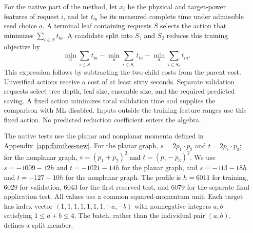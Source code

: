For the native part of the method, let $x_i$ be the physical and target-power features of request $i$, and let $t_{ia}$ be its measured complete time under admissible seed choice $a$. A terminal leaf containing requests $S$ selects the action that minimizes $\sum_{i\in S}t_{ia}$. A candidate split into $S_1$ and $S_2$ reduces this training objective by
\begin{equation}
 \min_a\sum_{i\in S}t_{ia}
 -\min_a\sum_{i\in S_1}t_{ia}
 -\min_a\sum_{i\in S_2}t_{ia}.
 \label{eq:vac-ml-loss}
\end{equation}
This expression follows by subtracting the two child costs from the parent cost. Unverified actions receive a cost of at least sixty seconds. Separate validation requests select tree depth, leaf size, ensemble size, and the required predicted saving. A fixed action minimizes total validation time and supplies the comparison with ML disabled. Inputs outside the training feature ranges use this fixed action. No predicted reduction coefficient enters the algebra.

The native tests use the planar and nonplanar momenta defined in Appendix~\ref{app:families-new}. For the planar graph, $s=2p_1\cdot p_2$ and $t=2p_1\cdot p_3$; for the nonplanar graph, $s=(p_1+p_2)^2$ and $t=(p_1-p_3)^2$. We use $s=-1009-12h$ and $t=-1021-14h$ for the planar graph, and $s=-113-18h$ and $t=-127-10h$ for the nonplanar graph. The profile is $h=6011$ for training, $6029$ for validation, $6043$ for the first reserved test, and $6079$ for the separate final application test. All values use a common squared-momentum unit. Each target has index vector $(1,1,1,1,1,1,1,-a,-b)$ with nonnegative integers $a,b$ satisfying $1\leq a+b\leq4$. The batch, rather than the individual pair $(a,b)$, defines a split member.
